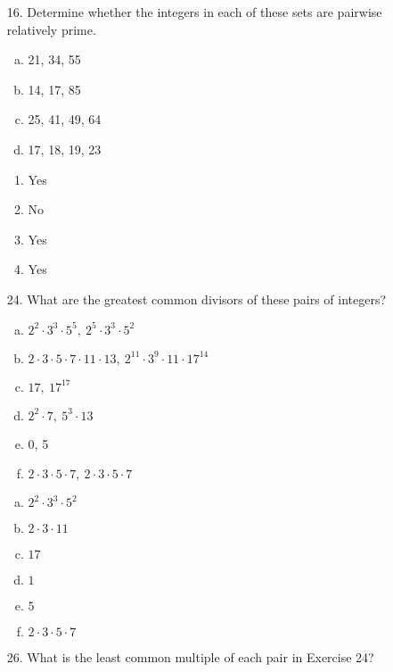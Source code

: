 \begin{itemize}
    \item[16.] Determine whether the integers in each of these sets are pairwise relatively prime.
          \begin{enumerate}[a.]
              \item 21, 34, 55
              \item 14, 17, 85
              \item 25, 41, 49, 64
              \item 17, 18, 19, 23
          \end{enumerate}
          \answer
          \begin{enumerate}[a]
              \item Yes
              \item No
              \item Yes
              \item Yes
          \end{enumerate}
    \item[24.] What are the greatest common divisors of these pairs of
          integers?
          \begin{enumerate}[a.]
              \item $2^2 \cdot 3^3 \cdot 5^5, \ 2^5 \cdot 3^3 \cdot 5^2$
              \item $2 \cdot 3 \cdot 5 \cdot 7 \cdot 11 \cdot 13, \ 2^{11} \cdot 3^9 \cdot 11 \cdot 17^{14}$
              \item $17,\  17^{17}$
              \item $2^2 \cdot 7,\ 5^3 \cdot 13$
              \item 0, 5
              \item $2 \cdot 3 \cdot 5 \cdot 7,\  2 \cdot 3 \cdot 5 \cdot 7$
          \end{enumerate}
          \answer
          \begin{enumerate}[a.]
              \item $2^2 \cdot 3^3 \cdot 5^2$
              \item $2 \cdot 3 \cdot 11$
              \item $17$
              \item $1$
              \item $5$
              \item $2 \cdot 3 \cdot 5 \cdot 7$
          \end{enumerate}
    \item[26.]  What is the least common multiple of each pair in Exercise 24?
          \begin{enumerate}[a.]

\end{enumerate}
\end{itemize}
